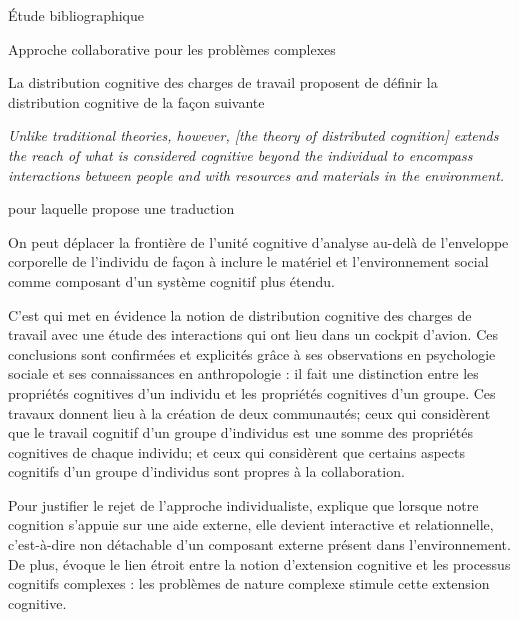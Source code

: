 \documentclass[myfrancais,ngerman,english,french]{mythesis}
\begin{document}
\begin{mychapter}{Étude bibliographique}
\begin{mysection}{Approche collaborative pour les problèmes complexes}
\begin{mysubsection}{La distribution cognitive des charges de travail}
				 proposent de définir la distribution cognitive de la façon suivante
				\begin{myquote}[english]
					\it Unlike traditional theories, however, [the theory of distributed cognition] extends the reach of what is considered cognitive beyond the individual to encompass interactions between people and with resources and materials in the environment.
				\end{myquote}
				pour laquelle  propose une traduction
				\begin{myquote}[french]
					On peut déplacer la frontière de l'unité cognitive d'analyse au-delà de l'enveloppe corporelle de l'individu de façon à inclure le matériel et l'environnement social comme composant d'un système cognitif plus étendu.
				\end{myquote}

				C'est  qui met en évidence la notion de distribution cognitive des charges de travail avec une étude des interactions qui ont lieu dans un cockpit d'avion.
				Ces conclusions sont confirmées et explicités grâce à ses observations en psychologie sociale et ses connaissances en anthropologie  : il fait une distinction entre les propriétés cognitives d'un individu et les propriétés cognitives d'un groupe.
				Ces travaux donnent lieu à la création de deux communautés; ceux qui considèrent que le travail cognitif d'un groupe d'individus est une somme des propriétés cognitives de chaque individu; et ceux qui considèrent que certains aspects cognitifs d'un groupe d'individus sont propres à la collaboration.

				Pour justifier le rejet de l'approche individualiste,  explique que lorsque notre cognition s'appuie sur une aide externe, elle devient interactive et relationnelle, c'est-à-dire non détachable d'un composant externe présent dans l'environnement.
				De plus,  évoque le lien étroit entre la notion d'extension cognitive et les processus cognitifs complexes : les problèmes de nature complexe stimule cette extension cognitive.


\end{mysubsection}
\end{mysection}
\end{mychapter}
\end{document}
